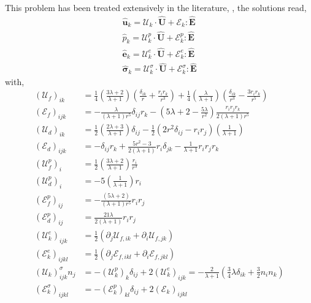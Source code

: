 This problem has been treated extensively in the literature, \citet{pozrikidis1992boundary,leal2007advanced,kim2013microhydrodynamics}, the solutions read, 
\begin{align}
    \hat{\textbf{u}}_k = \mathcal{U}_k\cdot \hat{\textbf{U}}+ \mathcal{E}_k : \hat{\textbf{E}}\\
    \hat{p}_k = \mathcal{U}_k^p\cdot \hat{\textbf{U}}+ \mathcal{E}_k^p : \hat{\textbf{E}}\\
    \hat{\textbf{e}}_k = \mathcal{U}_k^e\cdot \hat{\textbf{U}}+ \mathcal{E}_k^e : \hat{\textbf{E}}\\
    \hat{\bm\sigma}_k = \mathcal{U}_k^\sigma\cdot \hat{\textbf{U}}+ \mathcal{E}_k^\sigma : \hat{\textbf{E}}
    \label{eq:solution_hat}
\end{align}
with, 
\begin{align*}
    (\mathcal{U}_{f})_{ik} &= 
     \frac{1}{4}\left(\frac{3\lambda + 2}{\lambda +1}\right)
    \left(\frac{\delta_{ik}}{r} + \frac{r_ir_k}{r^3}\right) 
    + 
    \frac{1}{4}\left(\frac{\lambda}{\lambda +1}\right)
    \left(\frac{\delta_{ik}}{r^3} - \frac{3r_ir_k}{r^5}\right)  \\
    (\mathcal{E}_{f})_{ijk}
    &=
    -\frac{\lambda}{(\lambda + 1)r^5} \delta_{ij} r_k
    -\left(
        5\lambda +2
        - \frac{5\lambda}{r^2}
        \right) 
    \frac{r_ir_jr_k}{2(\lambda+1)r^5}\\
    (\mathcal{U}_{d})_{ik} &= 
    \frac{1}{2}\left(\frac{2\lambda +3}{\lambda +1}\right)\delta_{ij}
    -\frac{1}{2} (2r^2 \delta_{ij} - r_ir_j)
    \left(\frac{1}{\lambda +1}\right)\\
    (\mathcal{E}_{d})_{ijk}
    &= -\delta_{ij} r_k
    + \frac{5r^2 -3}{2(\lambda +1)} r_i\delta_{jk}
    - \frac{1}{\lambda+1}r_ir_jr_k\\
    (\mathcal{U}_f^p)_i &= 
      \frac{1}{2}\left(\frac{3\lambda + 2}{\lambda +1}\right) \frac{r_i}{r^3}\\
     (\mathcal{U}_d^p)_i &= 
    - 5 \left(\frac{1}{\lambda +1}\right) r_i\\
    (\mathcal{E}_f^p)_{ij} &= - \frac{(5\lambda+2)}{(\lambda+1)r^5}r_ir_j\\
    (\mathcal{E}_d^p)_{ij} &= \frac{21\lambda}{2(\lambda+1)} r_ir_j\\
    (\mathcal{U}_k^e)_{ijk}
    &= 
    \frac{1}{2}(
    \partial_j 
    \mathcal{U}_{f,ik}
    + 
    \partial_i 
    \mathcal{U}_{f,jk}
    )\\
    (\mathcal{E}_k^e)_{ijkl}
    &= 
    \frac{1}{2}(
    \partial_j 
    \mathcal{E}_{f,ikl}
    + 
    \partial_i 
    \mathcal{E}_{f,jkl}
    )\\
    (\mathcal{U}_k)_{ijk}^\sigma  n_j 
    &= 
     - (\mathcal{U}_k^p)_{k}\delta_{ij}
     + 2(\mathcal{U}_k^e)_{ijk}
     = - \frac{2}{\lambda +1}\left(
         \frac{3}{4}\lambda\delta_{ik} 
         + \frac{3}{2} n_in_k
     \right)
     \\
     (\mathcal{E}_k^\sigma)_{ijkl}
     &=
     - (\mathcal{E}_k^p)_{kl}\delta_{ij}
     + 2(\mathcal{E}_k)_{ijkl}
\end{align*}
